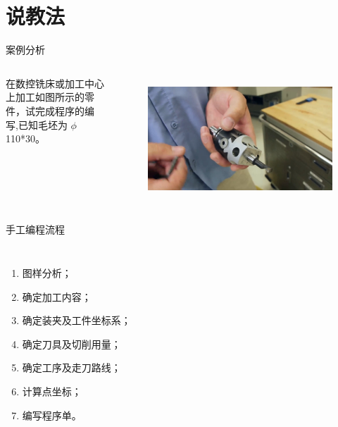 \documentclass[utf8,zihao=-4]{ctexbeamer}
\begin{document}
\section{说教法}
\begin{frame}{案例分析}
     \begin{columns}[onlytextwidth]
        在数控铣床或加工中心上加工如图所示的零件，试完成程序的编写,已知毛坯为 $\phi$ 110*30。

\begin{figure}
    \centering
    \includegraphics[width=0.8\linewidth,trim=50 150 50 100,clip]{image/4.jpg}
    \label{fig:4-1}
\end{figure}
    \end{columns}
\end{frame}

\begin{frame}{手工编程流程}
    \begin{columns}[onlytextwidth]
\begin{enumerate}
    \item 图样分析；
    \item 确定加工内容；
    \item 确定装夹及工件坐标系；
    \item 确定刀具及切削用量；
    \item 确定工序及走刀路线；
    \item 计算点坐标；
    \item 编写程序单。
\end{enumerate}
    \end{columns}
\end{frame}
\end{document}

